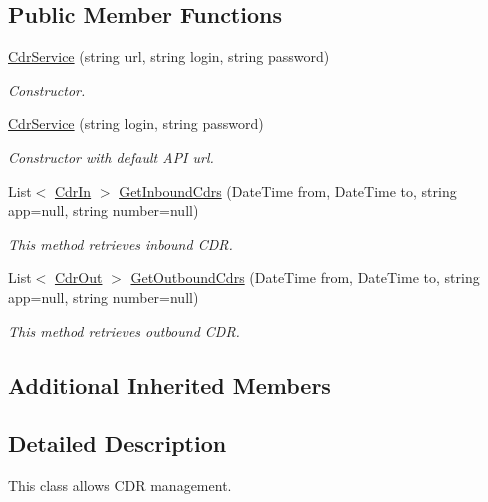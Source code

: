 \subsection*{Public Member Functions}
\begin{DoxyCompactItemize}
\item 
\hyperlink{class_thecallr_api_1_1_services_1_1_client_1_1_cdr_service_adab14d3ad6bf022e62612d9224a35ed1}{Cdr\+Service} (string url, string login, string password)
\begin{DoxyCompactList}\small\item\em Constructor. \end{DoxyCompactList}\item 
\hyperlink{class_thecallr_api_1_1_services_1_1_client_1_1_cdr_service_aeb5d25c9b53e011c26c1a57ddb87f35e}{Cdr\+Service} (string login, string password)
\begin{DoxyCompactList}\small\item\em Constructor with default A\+P\+I url. \end{DoxyCompactList}\item 
List$<$ \hyperlink{class_thecallr_api_1_1_objects_1_1_cdr_1_1_cdr_in}{Cdr\+In} $>$ \hyperlink{class_thecallr_api_1_1_services_1_1_client_1_1_cdr_service_a8d3a3be9079ca5b31c0c393e663c090e}{Get\+Inbound\+Cdrs} (Date\+Time from, Date\+Time to, string app=null, string number=null)
\begin{DoxyCompactList}\small\item\em This method retrieves inbound C\+D\+R. \end{DoxyCompactList}\item 
List$<$ \hyperlink{class_thecallr_api_1_1_objects_1_1_cdr_1_1_cdr_out}{Cdr\+Out} $>$ \hyperlink{class_thecallr_api_1_1_services_1_1_client_1_1_cdr_service_aac8d6b7689fcbd3987ae4a6de6753c49}{Get\+Outbound\+Cdrs} (Date\+Time from, Date\+Time to, string app=null, string number=null)
\begin{DoxyCompactList}\small\item\em This method retrieves outbound C\+D\+R. \end{DoxyCompactList}\end{DoxyCompactItemize}
\subsection*{Additional Inherited Members}


\subsection{Detailed Description}
This class allows C\+D\+R management. 



